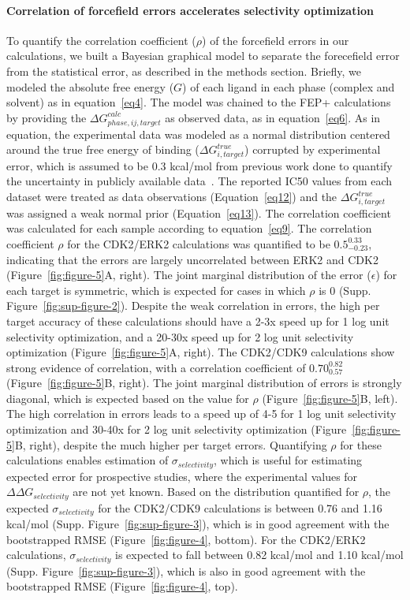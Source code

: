 \documentclass[9pt,lineno]{elife-modified} %
\begin{document}
\paragraph{Correlation of forcefield errors accelerates selectivity optimization}
To quantify the correlation coefficient ($
\rho$) of the forcefield errors in our calculations, we built a Bayesian graphical model to separate the forecefield error from the statistical error, as described in the methods section. Briefly, we modeled the absolute free energy ($G$) of each ligand in each phase (complex and solvent) as in equation~\ref{eq4}. The model was chained to the FEP+ calculations by providing the $\Delta G^{calc}_{phase,ij,target}$ as observed data, as in equation~\ref{eq6}. As in equation, the experimental data was modeled as a normal distribution centered around the true free energy of binding ($\Delta G^{true}_{i,target}$) corrupted by experimental error, which is assumed to be 0.3 kcal/mol from previous work done to quantify the uncertainty in publicly available data~\citep{BROWN2009420}. The reported IC50 values from each dataset were treated as data observations (Equation~\ref{eq12}) and the $\Delta G^{true}_{i,target}$ was assigned a weak normal prior (Equation~\ref{eq13}). The correlation coefficient was calculated for each sample according to equation~\ref{eq9}. 
The correlation coefficient $\rho$ for the CDK2/ERK2 calculations was quantified to be $0.5^{0.33}_{-0.23}$, indicating that the errors are largely uncorrelated between ERK2 and CDK2 (Figure~\ref{fig:figure-5}A, right). The joint marginal distribution of the error ($\epsilon$) for each target is symmetric, which is expected for cases in which $\rho$ is 0 (Supp. Figure~\ref{fig:sup-figure-2}). Despite the weak correlation in errors, the high per target accuracy of these calculations should have a 2-3x speed up for 1 log unit selectivity optimization, and a 20-30x speed up for 2 log unit selectivity optimization (Figure~\ref{fig:figure-5}A, right). 
The CDK2/CDK9 calculations show strong evidence of correlation, with a correlation coefficient of $0.70^{0.82}_{0.57}$ (Figure~\ref{fig:figure-5}B, right). The joint marginal distribution of errors is strongly diagonal, which is expected based on the value for $\rho$ (Figure~\ref{fig:figure-5}B, left). The high correlation in errors leads to a speed up of 4-5 for 1 log unit selectivity optimization and 30-40x for 2 log unit selectivity optimization (Figure~\ref{fig:figure-5}B, right), despite the much higher per target errors.
Quantifying $\rho$ for these calculations enables estimation of $\sigma_{selectivity}$, which is useful for estimating expected error for prospective studies, where the experimental values for $\Delta \Delta G_{selectivity}$ are not yet known. Based on the distribution quantified for $\rho$, the expected $\sigma_{selectivity}$ for the CDK2/CDK9 calculations is between 0.76 and 1.16 kcal/mol (Supp. Figure~\ref{fig:sup-figure-3}), which is in good agreement with the bootstrapped RMSE (Figure~\ref{fig:figure-4}, bottom). For the CDK2/ERK2 calculations, $\sigma_{selectivity}$ is expected to fall between 0.82 kcal/mol and 1.10 kcal/mol (Supp. Figure~\ref{fig:sup-figure-3}), which is also in good agreement with the bootstrapped RMSE (Figure~\ref{fig:figure-4}, top). 
\end{document}
